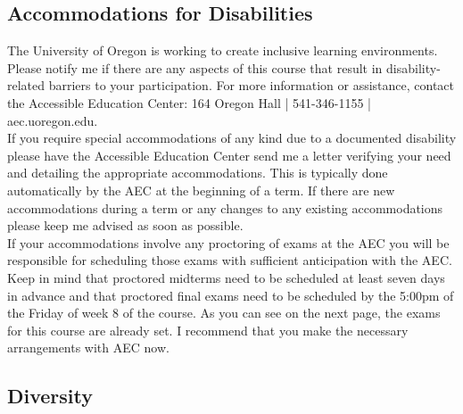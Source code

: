 \documentclass[11pt]{article}
\begin{document}
	
	\subsection*{Accommodations for Disabilities}
	The University of Oregon is working to create inclusive learning environments. Please notify me if there are any aspects of this course that result in disability-related barriers to your participation. For more information or assistance, contact the Accessible Education Center: 164 Oregon Hall | 541-346-1155 | aec.uoregon.edu.\\
	
	If you require special accommodations of any kind due to a documented disability please have the Accessible Education Center send me a letter verifying your need and detailing the appropriate accommodations. This is typically done automatically by the AEC at the beginning of a term. If there are new accommodations during a term or any changes to any existing accommodations please keep me advised as soon as possible.\\
	
\noindent	If your accommodations involve any proctoring of exams at the AEC you will be responsible for scheduling those exams with sufficient anticipation with the AEC. Keep in mind that proctored midterms need to be scheduled at least seven days in advance and that proctored final exams need to be scheduled by the 5:00pm of the Friday of week 8 of the course. As you can see on the next page, the exams for this course are already set. I recommend that you make the necessary arrangements with AEC now.
	
	\subsection*{Diversity}
	
\end{document}
